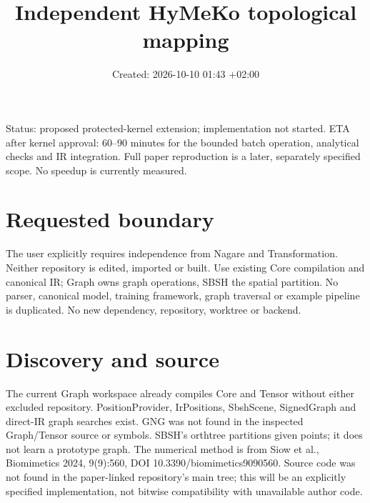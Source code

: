 \documentclass{article}
\title{Independent HyMeKo topological mapping}
\date{Created: 2026-10-10 01:43 +02:00}
\begin{document}
\maketitle
\noindent Status: proposed protected-kernel extension; implementation not started.
ETA after kernel approval: 60--90 minutes for the bounded batch operation,
analytical checks and IR integration. Full paper reproduction is a later,
separately specified scope. No speedup is currently measured.
\section*{Requested boundary}
The user explicitly requires independence from Nagare and Transformation.
Neither repository is edited, imported or built. Use existing Core compilation
and canonical IR; Graph owns graph operations, SBSH the spatial partition.
No parser, canonical model, training framework, graph traversal or example
pipeline is duplicated. No new dependency, repository, worktree or backend.

\section*{Discovery and source}
The current Graph workspace already compiles Core and Tensor without either
excluded repository. PositionProvider, IrPositions, SbshScene, SignedGraph and
direct-IR graph searches exist. GNG was not found in the inspected Graph/Tensor
source or symbols. SBSH's orthtree partitions given points; it does not learn a
prototype graph. The numerical method is from Siow et al., Biomimetics 2024,
9(9):560, DOI 10.3390/biomimetics9090560. Source code was not found in the
paper-linked repository's main tree; this will be an explicitly specified
implementation, not bitwise compatibility with unavailable author code.
\end{document}
